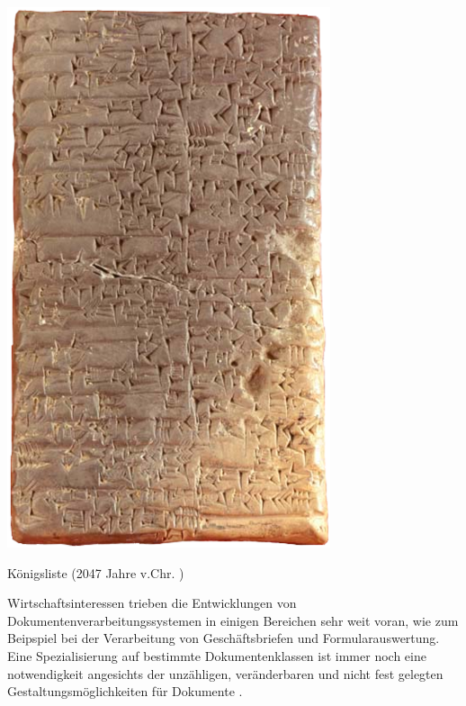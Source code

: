 \begin{marginfigure}
    \includegraphics[width=\textwidth]{figures/img/359px-Cuneiform_script2.png}
    \caption{Königsliste (2047 Jahre v.Chr. \cite{DavidgeCuneiformscript2jpg})}
    \label{fig:tablet}
\end{marginfigure}


Wirtschaftsinteressen trieben die Entwicklungen von Dokumentenverarbeitungssystemen in einigen Bereichen sehr weit voran, wie 
zum Beipspiel bei der Verarbeitung von Geschäftsbriefen und Formularauswertung.
Eine Spezialisierung auf bestimmte Dokumentenklassen ist immer noch eine notwendigkeit angesichts der unzähligen, veränderbaren und nicht fest gelegten Gestaltungsmöglichkeiten für Dokumente \parencite[69]{BairdEvolutionDocumentImage2014}.

